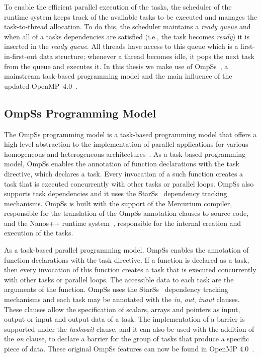 {To enable the efficient parallel execution of the tasks, the scheduler of the runtime system keeps track of the available tasks to be executed and manages the task-to-thread allocation.
To do this, the scheduler maintains a \textit{ready queue} and when all of a tasks dependencies are satisfied (i.e., the task becomes \textit{ready}) it is inserted in the \textit{ready queue}. 
All threads have access to this queue which is a first-in-first-out data structure; whenever a thread becomes idle, it pops the next task from the queue and executes it. 
In this thesis we make use of OmpSs~\cite{OmpSs}, a mainstream task-based programming model and the main influence of the updated OpenMP~4.0~\cite{OpenMP}.

\subsection{OmpSs Programming Model}
\label{sec.background.taskbased.ompss}

The OmpSs programming model is a task-based programming model that offers a high level abstraction to the implementation of parallel applications for various homogeneous and heterogeneous architectures~\cite{OmpSs_PPL11,OmpSs}. 
As a task-based programming model, OmpSs enables the annotation of function declarations with the task directive, which declares a task. 
Every invocation of a such function creates a task that is executed concurrently with other tasks or parallel loops. 
OmpSs also supports task dependencies and it uses the StarSs~\cite{StarSs} dependency tracking mechanisms. 
OmpSs is built with the support of the Mercurium compiler, responsible for the translation of the OmpSs annotation clauses to source code, and the Nanos++ runtime system~\cite{nanos}, responsible for the internal creation and execution of the tasks.

As a task-based parallel programming model, OmpSs enables the annotation of function declarations with the task directive. 
If a function is declared as a task, then every invocation of this function creates a task that is executed concurrently with other tasks or parallel loops. 
The accessible data to each task are the arguments of the function. 
OmpSs uses the StarSs~\cite{StarSs} dependency tracking mechanisms and each task may be annotated with the \textit{in}, \textit{out}, \textit{inout} clauses. 
These clauses allow the specification of scalars, arrays and pointers as input, output or input and output data of a task. 
The implementation of a barrier is supported under the \textit{taskwait} clause, and it can also be used with the addition of the \textit{on} clause, to declare a barrier for the group of tasks that produce a specific piece of data. 
These original OmpSs features can now be found in OpenMP 4.0~\cite{OpenMP}.

}
